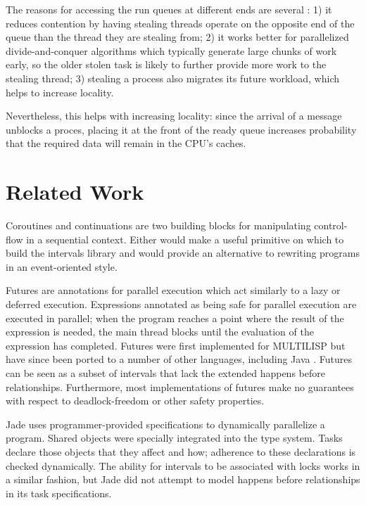 The reasons for accessing the run queues at different ends are several
\cite{Frigo1998}: 1) it reduces contention by having stealing threads
operate on the opposite end of the queue than the thread they are
stealing from; 2) it works better for parallelized divide-and-conquer
algorithms which typically generate large chunks of work early, so the
older stolen task is likely to further provide more work to the
stealing thread; 3) stealing a process also migrates its future
workload, which helps to increase locality.

Nevertheless, this helps with increasing locality: since the arrival
of a message unblocks a proces, placing it at the front of the ready
queue increases probability that the required data will remain in the
CPU’s caches.


\section{Related Work}
\label{sec:queues-conclusion-related-work}


Coroutines \cite{Conway1963} and continuations \cite{Reynolds1993} are
two building blocks for manipulating control-flow in a sequential
context. Either would make a useful primitive on which to build the
intervals library and would provide an alternative to rewriting
programs in an event-oriented style.

Futures are annotations for parallel execution which act similarly to
a lazy or deferred execution. Expressions annotated as being safe for
parallel execution are executed in parallel; when the program reaches
a point where the result of the expression is needed, the main thread
blocks until the evaluation of the expression has completed. Futures
were first implemented for MULTILISP \cite{Halstead1985} but have
since been ported to a number of other languages, including Java
\cite{Navabi2008}.  Futures can be seen as a subset of intervals that
lack the extended happens before relationships. Furthermore, most
implementations of futures make no guarantees with respect to
deadlock-freedom or other safety properties.

Jade \cite{Rinard1998} uses programmer-provided specifications to
dynamically parallelize a program. Shared objects were specially
integrated into the type system. Tasks declare those objects that they
affect and how; adherence to these declarations is checked
dynamically. The ability for intervals to be associated with locks
works in a similar fashion, but Jade did not attempt to model happens
before relationships in its task specifications.

